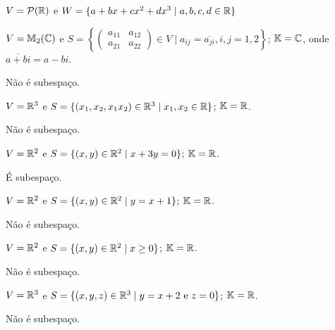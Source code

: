 \documentclass[12pt]{exam}
\begin{document}
\begin{exercicio}
    $V = \mathcal{P}(\mathbb{R})$ e $W = \{a + bx + cx^2 + dx^3\mid a, b, c, d \in \mathbb{R}\}$
\end{exercicio}

\begin{exercicio}
	$V = \mathbb{M}_2(\mathbb{C})$ e $S = \left\{\begin{pmatrix} a_{11} & a_{12}\\ a_{21} & a_{22}\end{pmatrix} \in V \mid a_{ij} = \overline{a_{ji}}, i, j = 1, 2\right\}$; $\mathbb{K} = \mathbb{C}$, onde $\overline{a + bi} = a - bi$.
	\begin{solucao}
		N\~ao \'e subespa\c{c}o.
	\end{solucao}
\end{exercicio}

\begin{exercicio}
	$V = \mathbb{R}^3$ e $S = \{(x_1, x_2, x_1x_2) \in \mathbb{R}^3 \mid x_1, x_2 \in \mathbb{R}\}$; $\mathbb{K} = \mathbb{R}$.
	\begin{solucao}
		N\~ao \'e subespa\c{c}o.
	\end{solucao}
\end{exercicio}

\begin{exercicio}
	$V = \mathbb{R}^2$ e $S = \{(x, y) \in \mathbb{R}^2 \mid x + 3y = 0\}$; $\mathbb{K} = \mathbb{R}$.
	\begin{solucao}
		\'E subespa\c{c}o.
	\end{solucao}
\end{exercicio}

\begin{exercicio}
	$V = \mathbb{R}^2$ e $S = \{(x, y) \in \mathbb{R}^2 \mid y = x + 1\}$; $\mathbb{K} = \mathbb{R}$.
	\begin{solucao}
		N\~ao \'e subespa\c{c}o.
	\end{solucao}
\end{exercicio}

\begin{exercicio}
	$V = \mathbb{R}^2$ e $S = \{(x, y) \in \mathbb{R}^2 \mid x \ge 0\}$; $\mathbb{K} = \mathbb{R}$.
	\begin{solucao}
		N\~ao \'e subespa\c{c}o.
	\end{solucao}
\end{exercicio}

\begin{exercicio}
	$V = \mathbb{R}^3$ e $S = \{(x, y, z) \in \mathbb{R}^3 \mid y = x + 2 \mbox{ e } z = 0\}$; $\mathbb{K} = \mathbb{R}$.
	\begin{solucao}
		N\~ao \'e subespa\c{c}o.
	\end{solucao}
\end{exercicio}
\end{document}

